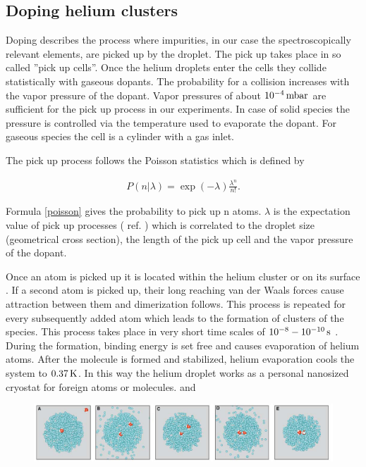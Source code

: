 \documentclass[parskip,12pt,headsepline,a4paper] {scrbook}
\begin{document}
\subsection{Doping helium clusters}
\vspace{-1\baselineskip}
Doping describes the process where impurities, in our case the spectroscopically relevant elements, are picked up by the droplet. The pick up takes place in so called ''pick up cells''. Once the helium droplets enter the cells they collide statistically with gaseous dopants. The probability for a collision increases with the vapor pressure of the dopant. Vapor pressures of about $\unit[10^{-4}]{mbar}$ are sufficient for the pick up process in our experiments. In case of solid species the pressure is controlled via the temperature used to evaporate the dopant. For gaseous species the cell is a cylinder with a gas inlet.

The pick up process follows the Poisson statistics which is defined by

\begin{align}  \label{poisson}
P(n|\lambda) = \exp(-\lambda) \frac{\lambda^n}{n!}.
\end{align}

Formula \ref{poisson} gives the probability to pick up n atoms. $\lambda$ is the expectation value of pick up processes ( ref. \cite{vdl}) which is correlated to the droplet size (geometrical cross section), the length of the pick up cell and the vapor pressure of the dopant.

Once an atom is picked up it is located within the helium cluster or on its surface \cite{pickup-desc}. If a second atom is picked up, their long reaching van der Waals forces cause attraction between them and dimerization follows. This process is repeated for every subsequently added atom which leads to the formation of clusters of the species. This process takes place in very short time scales of $\unit[10^{-8} - 10^{-10}]{s}$ \cite{toennis}. During the formation, binding energy is set free and causes evaporation of helium atoms. After the molecule is formed and stabilized, helium evaporation cools the system to $\unit[0.37]{K}$. In this way the helium droplet works as a personal nanosized cryostat for foreign atoms or molecules. \cite{evap-cryo} and \cite{ernst2011}

\begin{figure}[ht]
\centerline{
\includegraphics[width=13cm]{./doping/doping-helium.jpg}}
\end{figure}
\end{document}
